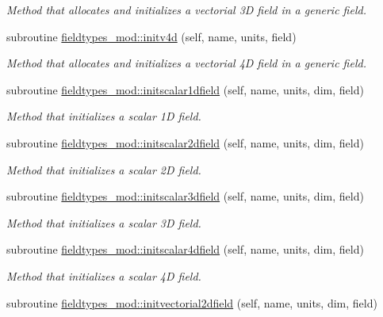 \begin{DoxyCompactItemize}
\begin{DoxyCompactList}\small\item\em Method that allocates and initializes a vectorial 3D field in a generic field. \end{DoxyCompactList}\item 
subroutine \mbox{\hyperlink{namespacefieldtypes__mod_a08d665678bea0956a323d08863e164e5}{fieldtypes\+\_\+mod\+::initv4d}} (self, name, units, field)
\begin{DoxyCompactList}\small\item\em Method that allocates and initializes a vectorial 4D field in a generic field. \end{DoxyCompactList}\item 
subroutine \mbox{\hyperlink{namespacefieldtypes__mod_a96ff5318da6a7db8bb61c525315c1c89}{fieldtypes\+\_\+mod\+::initscalar1dfield}} (self, name, units, dim, field)
\begin{DoxyCompactList}\small\item\em Method that initializes a scalar 1D field. \end{DoxyCompactList}\item 
subroutine \mbox{\hyperlink{namespacefieldtypes__mod_a1a3160727c99017639d758aad9031df5}{fieldtypes\+\_\+mod\+::initscalar2dfield}} (self, name, units, dim, field)
\begin{DoxyCompactList}\small\item\em Method that initializes a scalar 2D field. \end{DoxyCompactList}\item 
subroutine \mbox{\hyperlink{namespacefieldtypes__mod_a3f2b90bc391ea5b84ead8069ee90f515}{fieldtypes\+\_\+mod\+::initscalar3dfield}} (self, name, units, dim, field)
\begin{DoxyCompactList}\small\item\em Method that initializes a scalar 3D field. \end{DoxyCompactList}\item 
subroutine \mbox{\hyperlink{namespacefieldtypes__mod_a21dba84bb8fdb02d8bf5fd0052b51283}{fieldtypes\+\_\+mod\+::initscalar4dfield}} (self, name, units, dim, field)
\begin{DoxyCompactList}\small\item\em Method that initializes a scalar 4D field. \end{DoxyCompactList}\item 
subroutine \mbox{\hyperlink{namespacefieldtypes__mod_ac3e3d9aabba3893d61583e890e3bdf41}{fieldtypes\+\_\+mod\+::initvectorial2dfield}} (self, name, units, dim, field)

\end{DoxyCompactItemize}

